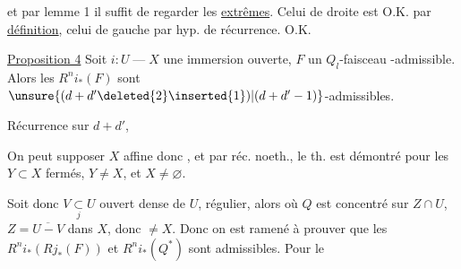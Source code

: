 et  par lemme 1 il suffit de regarder les \uline{extrêmes}.
Celui de droite est O.K.  par \uline{définition},
celui de gauche par hyp. de récurrence. O.K.

\uline{Proposition 4}\quad
Soit \(i:U\mathbin{\text{---}}X\) une immersion ouverte,
\(F\) un  \(Q_l\)-faisceau
-admissible.
Alors les \(R^ni_*(F)\) sont
\(\unsure{(d+d'\deleted{2}\inserted{1})|(d+d'-1)}\)-admissibles.

Récurrence sur \(d+d'\),

On peut supposer \(X\) affine donc ,
et par réc. noeth.,  le th. est démontré pour les
\(Y\subset X\) fermés, \(Y\ne X\), et \(X\ne\varnothing\).

Soit donc \(V\underset{j}{\subset}U\) ouvert dense de \(U\), régulier, alors
où \(Q\) est concentré sur \(Z\cap U\),
\(Z=\overline{U-V}\) \uline{} dans \(X\), donc \(\ne X\).
Donc on est ramené à prouver que les
\(R^ni_*(Rj_*(F))\) et \(R^ni_*(Q^*)\) sont admissibles.
Pour le
